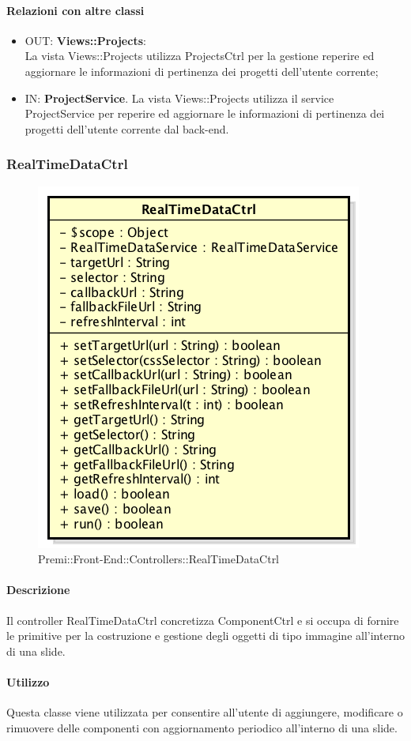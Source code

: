 	\paragraph{Relazioni con altre classi}
	\begin{itemize}
	  \item OUT: \textbf{Views::Projects}:\\
		La vista Views::Projects utilizza ProjectsCtrl per la gestione reperire ed aggiornare le informazioni di pertinenza dei progetti dell'utente corrente;
	  \item IN: \textbf{ProjectService}.
		La vista Views::Projects utilizza il service ProjectService per reperire ed aggiornare le informazioni di pertinenza dei progetti dell'utente corrente dal back-end.
	\end{itemize}

\newpage

\subsubsection{RealTimeDataCtrl}
\begin{figure}[h]
	\centering
	\includegraphics[width=0.5\linewidth]{img/premi_front_end_controllers_realtimedatactrl}
	\caption[Premi::Front-End::Controllers::RealTimeDataCtrl]{Premi::Front-End::Controllers::RealTimeDataCtrl}
\end{figure}
\paragraph{Descrizione}
Il controller RealTimeDataCtrl concretizza ComponentCtrl e si occupa di fornire le primitive per la costruzione e gestione degli oggetti di tipo immagine all'interno di una slide.

\paragraph{Utilizzo}
Questa classe viene utilizzata per consentire all'utente di aggiungere, modificare o rimuovere delle componenti con aggiornamento periodico all'interno di una slide.

